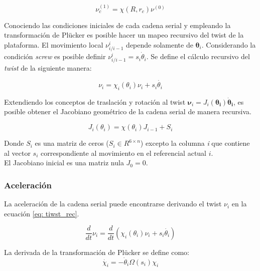 \begin{equation}\label{eq: plucker mapping}
 \nu_c^{(1)} = \chi(R, r_c) \nu^{(0)}
\end{equation}


Conociendo las condiciones iniciales de cada cadena serial
y empleando la transformación de Plücker
es posible hacer un mapeo recursivo del twist
de la plataforma.
El movimiento local 
$\nu_{i/i-1}^{i}$ depende solamente de 
$\boldsymbol \theta_i$.
Considerando la condición \emph{screw}
es posible definir 
$\nu_{i/i-1}^{i} = s_i \dot{\theta}_i$.
Se define el cálculo recursivo del \emph{twist} 
de la siguiente manera:

\begin{equation} \label{eq: tiwst_rec}
\nu_i = \chi_i(\theta_i)\nu_i + s_i\dot{\theta_i}
\end{equation}

Extendiendo los conceptos de traslación y rotación al twist 
$\boldsymbol \nu_i = J_i(\boldsymbol{\theta_i}) \boldsymbol{\dot \theta_i}$, 
es posible obtener el Jacobiano geométrico 
de la cadena serial de manera recursiva. 

\begin{equation}
J_i(\theta_i) = \chi(\theta_i) J_{i-1} + S_i
\end{equation}

Donde $S_i$ es una matriz de ceros 
($S_i \in R^{6\times n}$) excepto la columna 
\emph{i} que contiene al vector $s_i$ correspondiente 
al movimiento en el referencial actual $i$.\\
El Jacobiano inicial es una matriz nula $J_0 = 0$.

\subsubsection{Aceleración}

La aceleración de la cadena serial puede 
encontrarse derivando el twist $\nu_i $ en la ecuación 
\eqref{eq: tiwst_rec}.

\begin{equation}\label{eq: d twist}
\dfrac{d}{dt} \nu_i = \frac{d}{dt} (\chi_i(\theta_i)\nu_i + s_i\dot{\theta_i})
\end{equation}

La derivada de la transformación de Plücker 
se define como:
\begin{equation}\label{eq: d plucker}
\dot{\chi_i} = -\dot \theta_i \Omega(s_i) \chi_i
\end{equation}

